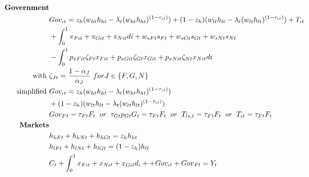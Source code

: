 \begin{align}
\text{\textbf{Government}}&\nonumber\\
&Gov_{\iota t}=z_h(w_{ht}h_{ht}-\lambda_t(w_{ht}h_{ht})^{(1-\tau_{\iota t})})+(1-z_h)(w_{lt}h_{lt}-\lambda_t(w_{lt}h_{lt})^{(1-\tau_{\iota t})})+T_{\iota t}\nonumber\\&+\int_{0}^{1}\pi_{Fit}+\pi_{Git}+\pi_{Nit}di+ w_{sFt}s_{Ft}+w_{sGt}s_{Gt}+w_{sNt}s_{Nt}\nonumber\\ &-\int_{0}^{1} p_{xFit}\zeta_{Ft}x_{Fit}+p_{xGit}\zeta_{Gt}x_{Git}+ p_{xNit}\zeta_{Nt}x_{Nit}di\nonumber\\
\text{with}\ \vspace{4mm}&\zeta_{Jt}=\frac{1-\alpha_J}{\alpha_J}\ for J\in\{F,G,N\}\nonumber \\
\text{simplified}\ \vspace{4mm} & Gov_{\iota t}= z_h(w_{ht}h_{ht}-\lambda_t(w_{ht}h_{ht})^{(1-\tau_{\iota t})})\nonumber\\&+(1-z_h)(w_{lt}h_{lt}-\lambda_t(w_{lt}h_{lt})^{(1-\tau_{\iota t})})
\nonumber\\\
&Gov_{Ft}=\tau_{Ft}F_t\hspace{2mm} or\hspace{2mm} \tau_{Gt}p_{Gt}G_t=\tau_{Ft}F_t \hspace{2mm} or \hspace{2mm} T_{ls, t}=\tau_{Ft}F_t\hspace{2mm} or \hspace{2mm} T_{\iota t}=\tau_{Ft}F_t\nonumber \\
\text{\textbf{Markets}}&\nonumber\\
&h_{hFt}+h_{hNt}+h_{hGt}=z_{h} h_{ht}\nonumber\\
&h_{lFt}+h_{lNt}+h_{lGt}=(1-z_h) h_{lt}\nonumber\\
&C_{t}+\int_{0}^{1} x_{Fit}+x_{Nit}+x_{Git}d_i++Gov_{\iota t}+Gov_{Ft}=Y_t\nonumber
\end{align}

